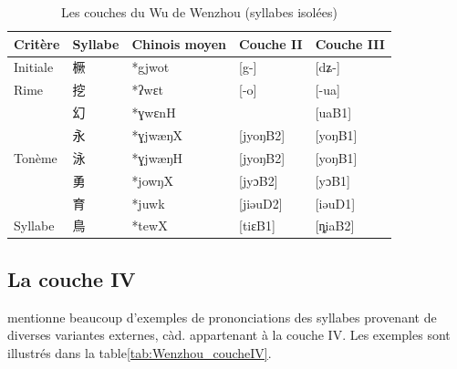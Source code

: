 \documentclass{scrbook}
\newcounter{c}[subsubsection]
\newcommand{\illustre}{Les exemples sont illustrés dans la table\xspace}
\begin{document}
\begin{sloppypar}
\begin{table}[htbp]
  \centering
    \begin{tabular}{lllll}
    \toprule
    Critère & Syllabe & Chinois moyen  & Couche II & Couche III \\
    \midrule
    Initiale & 橛     & *gjwot & [g-]  & [dʑ-] \\
    \midrule
    Rime  & 挖     & *ʔwɛt & [-o]  & [-ua] \\
    \midrule
    \multirow{5}[2]{*}{Tonème} & 幻     & *ɣwɛnH &       & [uaB1] \\
          & 永     & *ɣjwæŋX & [jyoŋB2] & [yoŋB1] \\
          & 泳     & *ɣjwæŋH & [jyoŋB2] & [yoŋB1] \\
          & 勇     & *jowŋX & [jyɔB2] & [yɔB1] \\
          & 育     & *juwk & [jiəuD2] & [iəuD1] \\
    \midrule
    Syllabe & 鳥     & *tewX & [tiɛB1] & [ȵiaB2] \\
    \bottomrule
    \end{tabular}%
  \caption{Les couches du Wu de Wenzhou (syllabes isolées)}
  \label{tab:Wenzhou1iso}%
\end{table}%

\subsection{La couche IV}
\textcite[101--107]{Zhengzhang2008wenzhou} mentionne beaucoup d'exemples de prononciations des syllabes provenant de diverses variantes externes, càd. appartenant à la couche IV. \illustre \ref{tab:Wenzhou_coucheIV}.


\end{sloppypar}
\end{document}
